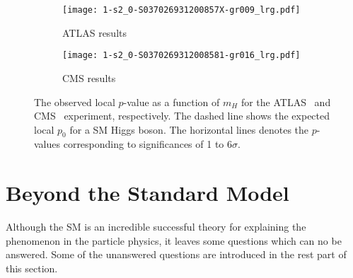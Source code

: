 \begin{figure}[htbp]
    \begin{center}
        \begin{subfigure}[b]{0.48\textwidth}
            \begin{center}
                \texttt{[image: 1-s2\_0-S037026931200857X-gr009\_lrg.pdf]}
                \caption{ATLAS results}
            \end{center}
        \end{subfigure}%
        \begin{subfigure}[b]{0.48\textwidth}
            \begin{center}
                \texttt{[image: 1-s2\_0-S0370269312008581-gr016\_lrg.pdf]}
                \caption{CMS results}
            \end{center}
        \end{subfigure}
    \end{center}
    \caption{The observed local $p$-value as a function of $m_{H}$ for the ATLAS~\cite{Aad:2012tfa} and CMS~\cite{Chatrchyan:2012xdj} experiment, respectively.
    The dashed line shows the expected local $p_{0}$ for a SM Higgs boson.
    The horizontal lines denotes the $p$-values corresponding to significances of 1 to 6$\sigma$.}
    \label{fig:sm_discovery_of_Higgs}
\end{figure}


\section{Beyond the Standard Model}
\label{sec:sm_bsm}
Although the SM is an incredible successful theory for explaining the phenomenon in the particle physics, it leaves some questions which can no be answered.
Some of the unanswered questions are introduced in the rest part of this section.


